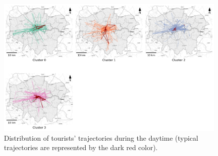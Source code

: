 \documentclass{article}
\theoremstyle{definition}
\theoremstyle{remark}
\begin{document}
\begin{figure}[!h]
\centering
\includegraphics[width=1\textwidth]{figures/traj_distribution_daytime_tourists.png}
\caption{\label{fig:traj_distribution_daytime_tourists}Distribution of tourists' trajectories during the daytime (typical trajectories are represented by the dark red color).}
\end{figure}
\end{document}
